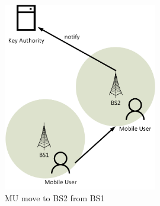 \documentclass{beamer}
\begin{document}
\begin{frame}{}
    \begin{figure}[t]
        \centering
        \includegraphics[width=0.6\textwidth]{figures/4.png}
        \caption {MU move to BS2 from BS1}
    \end{figure}
\end{frame}
\end{document}
